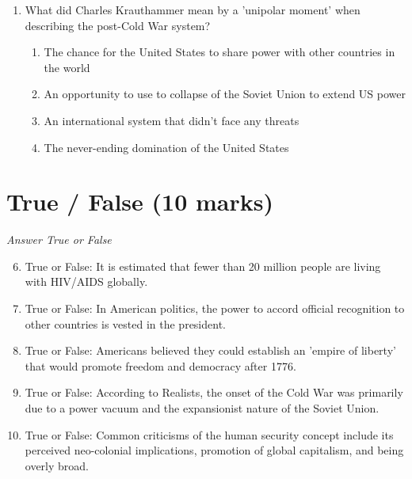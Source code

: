 \documentclass[12pt]{article}
\begin{document}
\begin{enumerate}[label=\arabic*.]
\begin{enumerate}[label=(\alph*)]
    \item the Chamber of Deputies.
    \item the Council of Ministers.
    \item the Secretariat.
\end{enumerate}
\item What did Charles Krauthammer mean by a 'unipolar moment' when describing the post-Cold War system?
\begin{enumerate}[label=(\alph*)]
    \item The chance for the United States to share power with other countries in the world
    \item An opportunity to use to collapse of the Soviet Union to extend US power
    \item An international system that didn't face any threats
    \item The never-ending domination of the United States
\end{enumerate}
\end{enumerate}

\section*{True / False (10 marks)}
\textit{Answer True or False}
\begin{enumerate}[label=\arabic*.]
\setcounter{enumi}{5}
\item True or False: It is estimated that fewer than 20 million people are living with HIV/AIDS globally.
\item True or False: In American politics, the power to accord official recognition to other countries is vested in the president.
\item True or False: Americans believed they could establish an 'empire of liberty' that would promote freedom and democracy after 1776.
\item True or False: According to Realists, the onset of the Cold War was primarily due to a power vacuum and the expansionist nature of the Soviet Union.
\item True or False: Common criticisms of the human security concept include its perceived neo-colonial implications, promotion of global capitalism, and being overly broad.
\end{enumerate}
\end{document}
